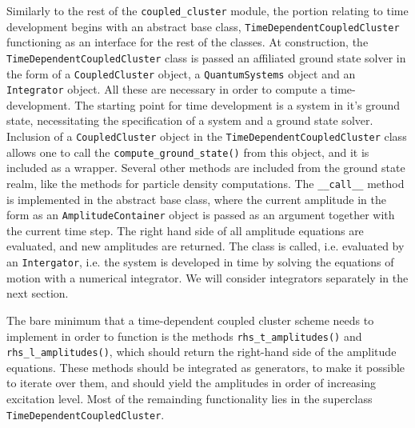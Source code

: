     Similarly to the rest of the \lstinline{coupled_cluster} module, the portion relating
    to time development begins with an abstract base class,
    \lstinline{TimeDependentCoupledCluster}
    functioning as an interface for the rest of the classes. At construction, the 
    \lstinline{TimeDependentCoupledCluster} class is passed an affiliated 
    ground state solver in the form of a \lstinline{CoupledCluster} object, a 
    \lstinline{QuantumSystems} object and an \lstinline{Integrator} object. All these 
    are necessary in order to compute a time-development. The starting point for 
    time development is a system in it's ground state, necessitating the specification 
    of a system and a ground state solver.
    Inclusion of a \lstinline{CoupledCluster} object in the 
    \lstinline{TimeDependentCoupledCluster} class allows one to call the 
    \lstinline{compute_ground_state()} from this object, and it is included as a 
    wrapper. Several other methods are included from the ground state realm, like 
    the methods for particle density computations. 
    The \lstinline{__call__} method is implemented in 
    the abstract base class, where the current amplitude in the form as an 
    \lstinline{AmplitudeContainer} object is passed as an argument 
    together with the current time step. The right hand side of all amplitude equations 
    are evaluated, and new amplitudes are returned. The class is called, i.e. evaluated 
    by an \lstinline{Intergator}, i.e. the system is developed in time by solving 
    the equations of motion with a numerical integrator.  We will consider 
    integrators separately in the next section.

    

    The bare minimum that a time-dependent coupled cluster scheme needs to implement 
    in order to function is the methods \lstinline{rhs_t_amplitudes()} and 
    \lstinline{rhs_l_amplitudes()}, which should return the right-hand side of 
    the amplitude equations. These methods should be integrated as generators, to make 
    it possible to iterate over them, and should yield the amplitudes in order of 
    increasing excitation level. Most of the remainding functionality lies in the 
    superclass \lstinline{TimeDependentCoupledCluster}.


